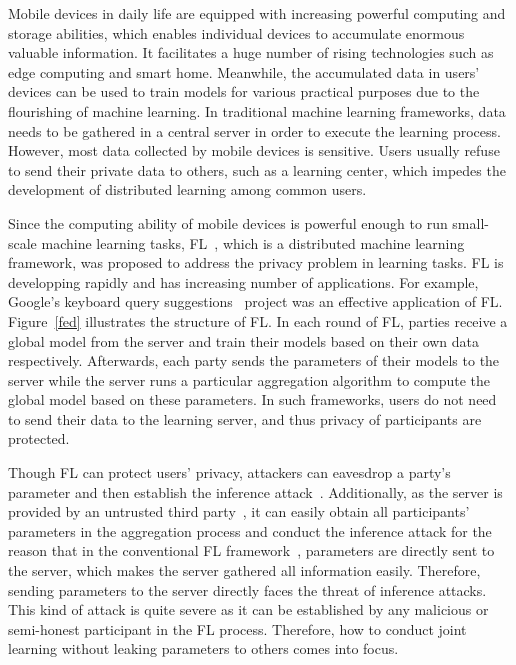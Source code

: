 Mobile devices in daily life are equipped with increasing powerful computing and storage abilities, which enables individual devices to accumulate enormous valuable information. It facilitates a huge number of rising technologies such as edge computing and smart home. Meanwhile, the accumulated data in users' devices can be used to train models for various practical purposes due to the flourishing of machine learning. In traditional machine learning frameworks, data needs to be gathered in a central server in order to execute the learning process. However, most data collected by mobile devices is sensitive. Users usually refuse to send their private data to others, such as a learning center, which impedes the development of distributed learning among common users.

Since the computing ability of mobile devices is powerful enough to run small-scale machine learning tasks, FL~\cite{mcmahan2016communicationefficient}, which is a distributed machine learning framework, was proposed to address the privacy problem in learning tasks. FL is developping rapidly and has increasing number of applications. For example, Google's keyboard query suggestions~\cite{yang2018applied} project was an effective application of FL. Figure~\ref{fed} illustrates the structure of FL. In each round of FL, parties receive a global model from the server and train their models based on their own data respectively. Afterwards, each party sends the parameters of their models to the server while the server runs a particular aggregation algorithm to compute the global model based on these parameters. In such frameworks, users do not need to send their data to the learning server, and thus privacy of participants are protected.

Though FL can protect users' privacy, attackers can eavesdrop a party's parameter and then establish the inference attack~\cite{Beyond, Leakage, Nasr19}. Additionally, as the server is provided by an untrusted third party~\cite{Nasr19}, it can easily obtain all participants' parameters in the aggregation process and conduct the inference attack for the reason that in the conventional FL framework~\cite{mcmahan2016communicationefficient}, parameters are directly sent to the server, which makes the server gathered all information easily. Therefore, sending parameters to the server directly faces the threat of inference attacks. This kind of attack is quite severe as it can be established by any malicious or semi-honest participant in the FL process. Therefore, how to conduct joint learning without leaking parameters to others comes into focus.

